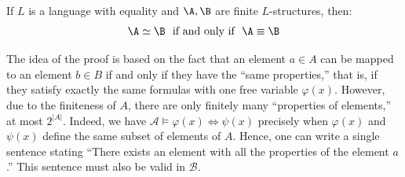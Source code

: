 \begin{proposition}
    If $L$ is a language with equality and $\A, \B$ are finite $L$-structures, then:
    $$
    \A \simeq \B\ \text{ if and only if }\ \A \equiv \B
    $$
\end{proposition}
The idea of the proof is based on the fact that an element $a \in A$ can be mapped to an element $b \in B$ if and only if they have the ``same properties,'' that is, if they satisfy exactly the same formulas with one free variable $\varphi(x)$. However, due to the finiteness of $A$, there are only finitely many ``properties of elements,'' at most $2^{|A|}$. Indeed, we have $\mathcal A \models \varphi(x) \iff \psi(x)$ precisely when $\varphi(x)$ and $\psi(x)$ define the same subset of elements of $A$. Hence, one can write a single sentence stating ``There exists an element with all the properties of the element $a$.'' This sentence must also be valid in $\mathcal B$.
